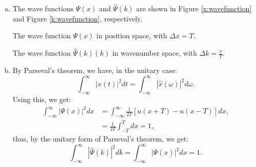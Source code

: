 \begin{enumerate}
\begin{enumerate}[a)]
\item The wave functions $\Psi(x)$ and $\hat{\Psi}(k)$ are shown in Figure \ref{x:wavefunction} and Figure \ref{k:wavefunction}, respectively. 
\begin{marginfigure}
\caption{The wave function $\Psi(x)$ in position space, with $\Delta x=T$.}
\label{x:wavefunction}
\end{marginfigure}

\begin{marginfigure}
\caption{The wave function $\hat{\Psi}(k)(k)$ in wavenumber space, with $\Delta k=\frac{\pi}{T}$.}
\label{k:wavefunction}
\end{marginfigure}


\item By Parseval's theorem, we have, in the unitary case:
$$\int_{-\infty}^{\infty} |x(t)|^{2}dt=\int_{-\infty}^{\infty}|\hat{x}(\omega)|^{2}d\omega.$$
Using this, we get:
\begin{align*}
    \int_{-\infty}^{\infty}|\Psi(x)|^{2}dx&=\int_{-\infty}^{\infty}\frac{1}{2T}[u(x + T) - u(x - T)]dx, \\
            &= \frac{1}{2T}\int_{-T}^{T}dx=1,
\end{align*}
thus, by the unitary form of Parseval's theorem, we get:
$$\int_{-\infty}^{\infty}|\hat{\Psi}(k)|^{2}dk=\int_{-\infty}^{\infty}|\Psi(x)|^{2}dx=1.$$


\end{enumerate}
\end{enumerate}
